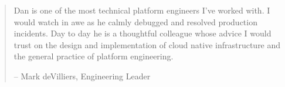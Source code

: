 \documentclass[
]{article}
\begin{document}
\begin{quote}
Dan is one of the most technical platform engineers I've worked with. I
would watch in awe as he calmly debugged and resolved production
incidents. Day to day he is a thoughtful colleague whose advice I would
trust on the design and implementation of cloud native infrastructure
and the general practice of platform engineering.

-- Mark deVilliers, Engineering Leader
\end{quote}
\end{document}
